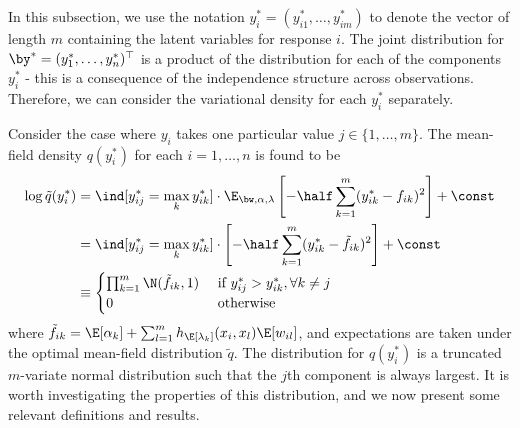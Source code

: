 \documentclass[]{article}
\begin{document}
In this subsection, we use the notation $y_i^* = (y_{i1}^*, \dots, y_{im}^*)$ to denote the vector of length $m$ containing the latent variables for response $i$. The joint distribution for $\by^* = (y_1^*, \dots, y_n^*)^\top$ is a product of the distribution for each of the components $y_i^*$ - this is a consequence of the independence structure across observations. Therefore, we can consider the variational density for each $y_i^*$ separately.

Consider the case where $y_i$ takes one particular value $j \in \{1,\dots,m\}$. The mean-field density $q(y_{i}^*)$ for each $i=1,\dots,n$ is found to be
\begin{align*}
  \log \tilde q(y_{i}^*) 
  &=  \ind[y_{ij}^* = \max_k y_{ik}^*] \cdot \E_{\bw, \alpha, \lambda} \left[ -\half \sum_{k=1}^m(y_{ik}^* - f_{ik})^2  \right] + \const \\
  &= \ind[y_{ij}^* = \max_k y_{ik}^*] \cdot \left[ -\half \sum_{k=1}^m(y_{ik}^* - \tilde f_{ik})^2  \right] + \const \\*
  &\equiv
  \begin{cases}
    \prod_{k=1}^m \N(\tilde f_{ik}, 1) & \text{ if } y_{ij}^* > y_{ik}^*, \forall k \neq j \\
    0 & \text{ otherwise} \\
  \end{cases}
\end{align*}
where $\tilde f_{ik} = \E[\alpha_k] + \sum_{l=1}^m h_{\E[\lambda_k]}(x_i, x_l)\E[w_{il}]$, and expectations are taken under the optimal mean-field distribution $\tilde q$. The distribution for $q(y_i^*)$ is a truncated $m$-variate normal distribution such that the $j$th component is always largest. It is worth investigating the properties of this distribution, and we now present some relevant definitions and results.
\end{document}
